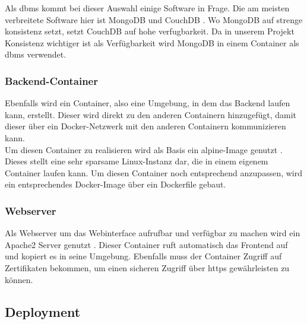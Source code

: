 		Als \gls{dbms} kommt bei dieser Auswahl einige Software in Frage. Die am meisten verbreitete Software hier ist MongoDB und CouchDB \cite{mongo}. Wo MongoDB auf strenge \gls{konsistenz} setzt, setzt CouchDB auf hohe \gls{verfugbarkeit}. Da in unserem Projekt Konsistenz wichtiger ist als Verfügbarkeit wird MongoDB in einem Container als \gls{dbms} verwendet.
		
		\subsubsection{Backend-Container}
		
		Ebenfalls wird ein Container, also eine Umgebung, in dem das Backend laufen kann, erstellt. Dieser wird direkt zu den anderen Containern hinzugefügt, damit dieser über ein Docker-Netzwerk mit den anderen Containern kommunizieren kann.~\\
		Um diesen Container zu realisieren wird als Basis ein alpine-Image genutzt \cite{alpine}. Dieses stellt eine sehr sparsame Linux-Instanz dar, die in einem eigenem Container laufen kann. Um diesen Container noch entsprechend anzupassen, wird ein entsprechendes Docker-Image über ein Dockerfile gebaut.
		
		\subsubsection{Webserver}
		
		Als Webserver um das Webinterface aufrufbar und verfügbar zu machen wird ein Apache2 Server genutzt \cite{apache}. Dieser Container ruft automatisch das Frontend auf und kopiert es in seine Umgebung. Ebenfalls muss der Container Zugriff auf Zertifikaten bekommen, um einen sicheren Zugriff über \gls{https} gewährleisten zu können.
				
	\subsection{Deployment}
	

